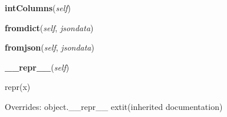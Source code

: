     \vspace{0.5ex}

\hspace{.8\funcindent}\begin{boxedminipage}{\funcwidth}

    \raggedright \textbf{intColumns}(\textit{self})

\setlength{\parskip}{2ex}
\setlength{\parskip}{1ex}
    \end{boxedminipage}

    \label{db_log:Lines:fromdict}

    \vspace{0.5ex}

\hspace{.8\funcindent}\begin{boxedminipage}{\funcwidth}

    \raggedright \textbf{fromdict}(\textit{self}, \textit{jsondata})

\setlength{\parskip}{2ex}
\setlength{\parskip}{1ex}
    \end{boxedminipage}

    \label{db_log:Lines:fromjson}

    \vspace{0.5ex}

\hspace{.8\funcindent}\begin{boxedminipage}{\funcwidth}

    \raggedright \textbf{fromjson}(\textit{self}, \textit{jsondata})

\setlength{\parskip}{2ex}
\setlength{\parskip}{1ex}
    \end{boxedminipage}

    \vspace{0.5ex}

\hspace{.8\funcindent}\begin{boxedminipage}{\funcwidth}

    \raggedright \textbf{\_\_repr\_\_}(\textit{self})

\setlength{\parskip}{2ex}
    repr(x)

\setlength{\parskip}{1ex}
      Overrides: object.\_\_repr\_\_ 	extit{(inherited documentation)}

    \end{boxedminipage}

